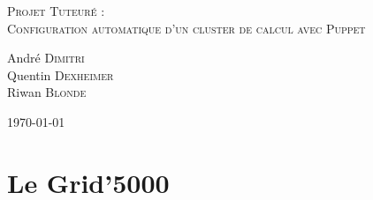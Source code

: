 \documentclass[a4paper, 10pt, onecolumn]{report}
\begin{document}
\newcommand{\bold}[1]{\textbf{#1}}
\newcommand{\italic}[1]{\textit{#1}}
\newcommand{\surligne}[1]{\underline{#1}}
\newcommand{\couleur}[1]{\textcolor{#1}}
\newcommand{\maj}[1]{\textsc{#1}}
\newcommand{\machine}[1]{\texttt{#1}}
\newcommand{\be}{\begin{enumerate}}
\newcommand{\ee}{\end{enumerate}}
\newcommand{\bi}{\begin{itemize}}
\newcommand{\ei}{\end{itemize}}

\pagestyle{fancy}
\fancyhf{}
\rhead{\leftmark}
\rfoot{\thepage}


\begin{titlepage}

\begin{center}


\textsc{\LARGE Projet Tuteuré : \\Configuration automatique d'un cluster de calcul avec Puppet}
\vfill



\vfill

\begin{minipage}{0.99\textwidth}
\begin{flushleft} \large
André \textsc{Dimitri}\\
Quentin \textsc{Dexheimer}\\
Riwan \textsc{Blonde}\\
\end{flushleft}
\end{minipage}
\begin{minipage}{0.99\textwidth}
\begin{flushright} \large
{\large \today}
\end{flushright}
\end{minipage}


\end{center}

\end{titlepage}



\tableofcontents


\chapter{Le Grid'5000}
\end{document}
